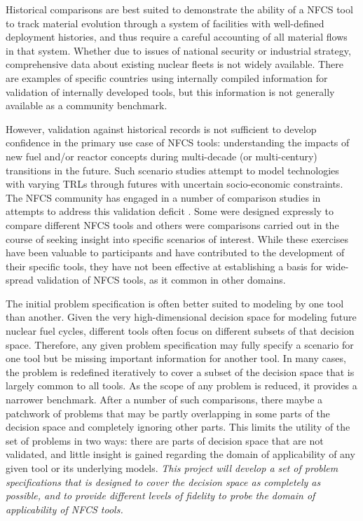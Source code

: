 Historical comparisons are best suited to demonstrate the ability of a
\gls{NFCS} tool to track material evolution through a system of facilities
with well-defined deployment histories, and thus require a careful accounting
of all material flows in that system.  Whether due to issues of national
security or industrial strategy, comprehensive data about existing nuclear
fleets is not widely available.  There are examples of specific countries
using internally compiled information for validation of internally developed
tools\cite{COSI6}, but this information is not generally available
as a community benchmark.

However, validation against historical records is not sufficient to develop
confidence in the primary use case of \gls{NFCS} tools: understanding the
impacts of new fuel and/or reactor concepts during multi-decade (or
multi-century) transitions in the future.  Such scenario studies attempt to
model technologies with varying \glspl{TRL} through futures with uncertain
socio-economic constraints.  The \gls{NFCS} community has engaged in a number of
comparison studies in attempts to address this validation deficit
\cite{NEAbenchmark, MITbenchmark, FENG.ANE.2016}. Some were designed expressly
to compare different \gls{NFCS} tools and others were comparisons carried out in
the course of seeking insight into specific scenarios of interest. While these
exercises have been valuable to participants and have contributed to the
development of their specific tools, they have not been effective at
establishing a basis for wide-spread validation of \gls{NFCS} tools, as it
common in other domains.

The initial problem specification is often better suited to modeling by one
tool than another.  Given the very high-dimensional decision space for
modeling future nuclear fuel cycles, different tools often focus on different
subsets of that decision space.  Therefore, any given problem specification
may fully specify a scenario for one tool but be missing important information
for another tool.  In many cases, the problem is redefined iteratively to
cover a subset of the decision space that is largely common to all tools.  As
the scope of any problem is reduced, it provides a narrower benchmark.  After
a number of such comparisons, there maybe a patchwork of problems that may be
partly overlapping in some parts of the decision space and completely ignoring
other parts.  This limits the utility of the set of problems in two ways:
there are parts of decision space that are not validated, and little insight
is gained regarding the domain of applicability of any given tool or its
underlying models. \emph{This project will develop a set of problem
  specifications that is designed to cover the decision space as completely
  as possible, and to provide different levels of fidelity to probe the domain
  of applicability of \gls{NFCS} tools.}

